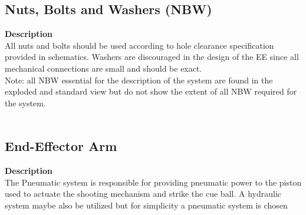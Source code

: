 \documentclass[titlepage]{article}
\begin{document}
\subsection{Nuts, Bolts and Washers (NBW)}
\textbf{Description}\\
All nuts and bolts should be used according to hole clearance specification provided in schematics. Washers are discouraged in the design of the EE since all mechanical connections are small and should be exact. \\Note: all NBW essential for the description of the system are found in the exploded and standard view but do not show the extent of all NBW required for the system.\\~\\

\newpage
\subsection{End-Effector Arm}
\textbf{Description}\\
The Pneumatic system is responsible for providing pneumatic power to the piston used to actuate the shooting mechanism and strike the cue ball. A hydraulic system maybe also be utilized but for simplicity a pneumatic system is chosen\\~\\

\newpage
\end{document}

